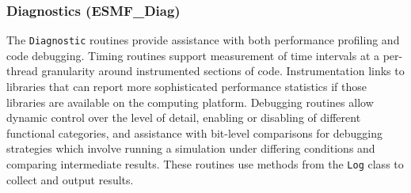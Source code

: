 \subsubsection{Diagnostics (ESMF\_Diag)}
\label{sec:diagnostics} 
The {\tt Diagnostic} routines provide assistance with both performance
profiling and code debugging.  Timing routines support measurement
of time intervals at a per-thread granularity around instrumented
sections of code.  Instrumentation links to libraries that can report 
more sophisticated performance statistics if those libraries are available 
on the computing platform.  Debugging routines allow dynamic control over the level
of detail, enabling or disabling of different functional categories,
and assistance with bit-level comparisons for debugging strategies which 
involve running a simulation under differing conditions and
comparing intermediate results.  These routines use methods from
the {\tt Log} class to collect and output results.








